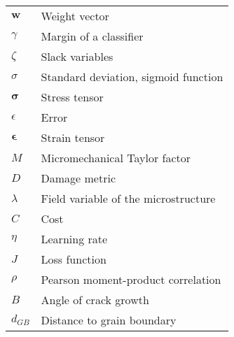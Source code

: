 
\begin{tabular}{ll}
  \hline
    $ \bm{w} $ & Weight vector \\
    $ \gamma $ & Margin of a classifier \\
    $ \zeta $ & Slack variables \\
    $ \sigma $ & Standard deviation, sigmoid function \\
    $ \bm{\sigma} $ & Stress tensor \\
    $ \epsilon $ & Error \\
    $ \bm{\epsilon} $ & Strain tensor \\
    $ M $ & Micromechanical Taylor factor \\
    $ D $ & Damage metric \\
    $ \lambda $ & Field variable of the microstructure \\
    $ C $ & Cost \\
    $ \eta $ & Learning rate \\
    $ J $ & Loss function \\
    $ \rho $ & Pearson moment-product correlation \\
    $ B $ & Angle of crack growth \\
    $ d_{GB} $ & Distance to grain boundary \\
  \hline
\end{tabular}
